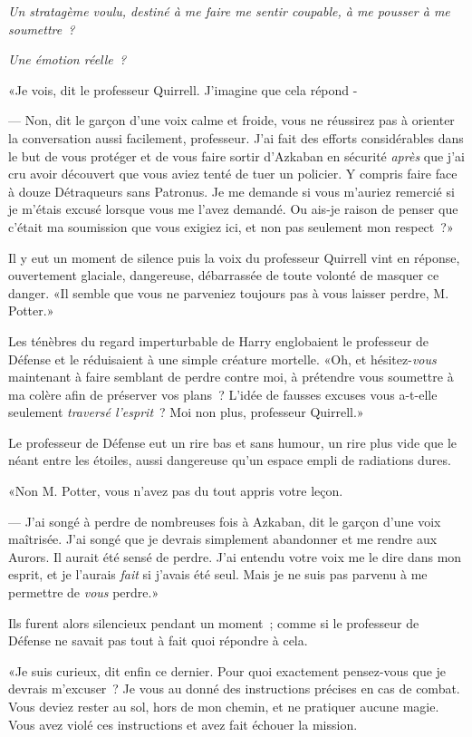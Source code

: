 \emph{Un stratagème voulu, destiné à me faire me sentir coupable, à me pousser à me soumettre~?}

\emph{Une émotion réelle~?}

«Je vois, dit le professeur Quirrell. J'imagine que cela répond -

--- Non, dit le garçon d'une voix calme et froide, vous ne réussirez pas à orienter la conversation aussi facilement, professeur. J'ai fait des efforts considérables dans le but de vous protéger et de vous faire sortir d'Azkaban en sécurité \emph{après} que j'ai cru avoir découvert que vous aviez tenté de tuer un policier. Y compris faire face à douze Détraqueurs sans Patronus. Je me demande si vous m'auriez remercié si je m'étais excusé lorsque vous me l'avez demandé. Ou ais-je raison de penser que c'était ma soumission que vous exigiez ici, et non pas seulement mon respect~?»

Il y eut un moment de silence puis la voix du professeur Quirrell vint en réponse, ouvertement glaciale, dangereuse, débarrassée de toute volonté de masquer ce danger. «Il semble que vous ne parveniez toujours pas à vous laisser perdre, M. Potter.»

Les ténèbres du regard imperturbable de Harry englobaient le professeur de Défense et le réduisaient à une simple créature mortelle. «Oh, et hésitez-\emph{vous} maintenant à faire semblant de perdre contre moi, à prétendre vous soumettre à ma colère afin de préserver vos plans~? L'idée de fausses excuses vous a-t-elle seulement \emph{traversé l'esprit}~? Moi non plus, professeur Quirrell.»

Le professeur de Défense eut un rire bas et sans humour, un rire plus vide que le néant entre les étoiles, aussi dangereuse qu'un espace empli de radiations dures.

«Non M. Potter, vous n'avez pas du tout appris votre leçon.

--- J'ai songé à perdre de nombreuses fois à Azkaban, dit le garçon d'une voix maîtrisée. J'ai songé que je devrais simplement abandonner et me rendre aux Aurors. Il aurait été sensé de perdre. J'ai entendu votre voix me le dire dans mon esprit, et je l'aurais \emph{fait} si j'avais été seul. Mais je ne suis pas parvenu à me permettre de \emph{vous} perdre.»

Ils furent alors silencieux pendant un moment~; comme si le professeur de Défense ne savait pas tout à fait quoi répondre à cela.

«Je suis curieux, dit enfin ce dernier. Pour quoi exactement pensez-vous que je devrais m'excuser~? Je vous au donné des instructions précises en cas de combat. Vous deviez rester au sol, hors de mon chemin, et ne pratiquer aucune magie. Vous avez violé ces instructions et avez fait échouer la mission.

